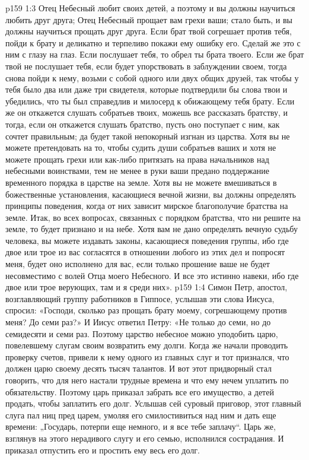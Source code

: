 \vs p159 1:3 Отец Небесный любит своих детей, а поэтому и вы должны научиться любить друг друга; Отец Небесный прощает вам грехи ваши; стало быть, и вы должны научиться прощать друг друга. Если брат твой согрешает против тебя, пойди к брату и деликатно и терпеливо покажи ему ошибку его. Сделай же это с ним с глазу на глаз. Если послушает тебя, то обрел ты брата твоего. Если же брат твой не послушает тебя, если будет упорствовать в заблуждении своем, тогда снова пойди к нему, возьми с собой одного или двух общих друзей, так чтобы у тебя было два или даже три свидетеля, которые подтвердили бы слова твои и убедились, что ты был справедлив и милосерд к обижающему тебя брату. Если же он откажется слушать собратьев твоих, можешь все рассказать братству, и тогда, если он откажется слушать братство, пусть оно поступает с ним, как сочтет правильным; да будет такой непокорный изгнан из царства. Хотя вы не можете претендовать на то, чтобы судить души собратьев ваших и хотя не можете прощать грехи или как\hyp{}либо притязать на права начальников над небесными воинствами, тем не менее в руки ваши предано поддержание временного порядка в царстве на земле. Хотя вы не можете вмешиваться в божественные установления, касающиеся вечной жизни, вы должны определять принципы поведения, когда от них зависит мирское благополучие братства на земле. Итак, во всех вопросах, связанных с порядком братства, что ни решите на земле, то будет признано и на небе. Хотя вам не дано определять вечную судьбу человека, вы можете издавать законы, касающиеся поведения группы, ибо где двое или трое из вас согласятся в отношении любого из этих дел и попросят меня, будет оно исполнено для вас, если только прошение ваше не будет несовместимо с волей Отца моего Небесного. И все это истинно навеки, ибо где двое или трое верующих, там и я среди них».
\vs p159 1:4 \pc Симон Петр, апостол, возглавляющий группу работников в Гиппосе, услышав эти слова Иисуса, спросил: «Господи, сколько раз прощать брату моему, согрешающему против меня? До семи раз?» И Иисус ответил Петру: «Не только до семи, но до семидесяти и семи раз. Поэтому царство небесное можно уподобить царю, повелевшему слугам своим возвратить ему долги. Когда же начали проводить проверку счетов, привели к нему одного из главных слуг и тот признался, что должен царю своему десять тысяч талантов. И вот этот придворный стал говорить, что для него настали трудные времена и что ему нечем уплатить по обязательству. Поэтому царь приказал забрать все его имущество, а детей продать, чтобы заплатить его долг. Услышав сей суровый приговор, этот главный слуга пал ниц пред царем, умоляя его смилостивиться над ним и дать еще времени: „Государь, потерпи еще немного, и я все тебе заплачу“. Царь же, взглянув на этого нерадивого слугу и его семью, исполнился сострадания. И приказал отпустить его и простить ему весь его долг.
